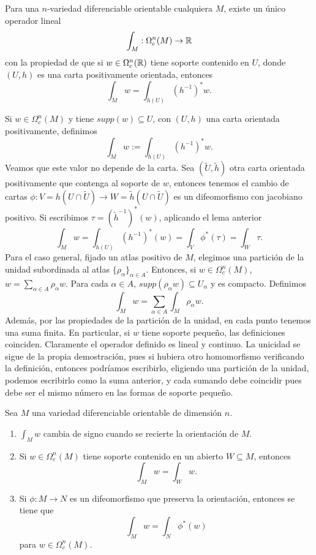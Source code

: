 \documentclass[CV.tex]{subfiles}
\begin{document}
\begin{prop}
Para una $n$-variedad diferenciable orientable cualquiera $M$, existe un único operador lineal 
\[
\int_M:\Omega_c^n(M)\to\mathbb{R}
\]
con la propiedad de que si $w\in\Omega_c^n(\mathbb{R})$ tiene soporte contenido en $U$, donde $(U,h)$ es una carta positivamente orientada, entonces
\[
\int_M w=\int_{h(U)}(h^{-1})^*w.
\]
\end{prop}
\begin{dem}
Si $w\in\Omega^n_c(M)$ y tiene $supp(w)\subseteq U$, con $(U,h)$ una carta orientada positivamente, definimos
\[
\int_M w:=\int_{h(U)}(h^{-1})^*w.
\]
Veamos que este valor no depende de la carta. Sea $(\tilde{U}, \tilde{h})$ otra carta orientada positivamente que contenga al soporte de $w$, entonces tenemos el cambio de cartas $\phi:V=h(U\cap\widetilde{U})\to W=\widetilde{h}(U\cap\widetilde{U})$ es un difeomorfismo con jacobiano positivo. Si escribimos $\tau=(\widetilde{h}^{-1})^*(w)$, aplicando el lema anterior
\[
\int_M w=\int_{h(U)}(h^{-1})^*(w)=\int_V\phi^*(\tau)=\int_W\tau.
\] 
Para el caso general, fijado un atlas positivo de $M$, elegimos una partición de la unidad subordinada al atlas $\{\rho_\alpha\}_{\alpha\in A}$. Entonces, si $w\in\Omega_c^n(M)$, $w=\sum_{\alpha\in A}\rho_\alpha w$. Para cada $\alpha\in A$, $supp(\rho_\alpha w)\subseteq U_\alpha$ y es compacto. Definimos
\[
\int_M w=\sum_{\alpha\in A}\int_M\rho_\alpha w. 
\]
Además, por las propiedades de la partición de la unidad, en cada punto tenemos una suma finita. En particular, si $w$ tiene soporte pequeño, las definiciones coinciden. Claramente el operador definido es lineal y continuo. La unicidad se sigue de la propia demostración, pues si hubiera otro homomorfismo verificando la definición, entonces podríamos escribirlo, eligiendo una partición de la unidad, podemos escribirlo como la suma anterior, y cada sumando debe coincidir pues debe ser el mismo número en las formas de soporte pequeño.
\QED
\end{dem}
\begin{lemma}
Sea $M$ una variedad diferenciable orientable de dimensión $n$.
\begin{enumerate}
\item  $\int_M w$ cambia de signo cuando se recierte la orientación de $M$.
\item Si $w\in \Omega_c^n(M)$ tiene soporte contenido en un abierto $W\subseteq M$, entonces
\[
\int_M w=\int_W w.
\]
\item Si $\phi:M\to N$ es un difeomorfismo que preserva la orientación, entonces se tiene que
\[
\int_M w=\int_N\phi^*(w)
\]
para $w\in\Omega_c^n(M)$. 
\end{enumerate}
\end{lemma}
\end{document}
